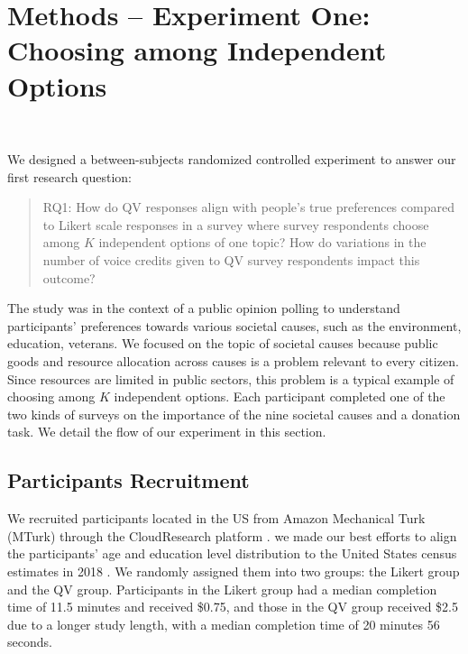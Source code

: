\section{Methods -- Experiment One: Choosing among Independent Options}~\label{method_exp1}

We designed a between-subjects randomized controlled experiment to answer our first research question: \begin{quote} RQ1: How do QV responses align with people's true preferences compared to Likert scale responses in a survey where survey respondents choose among $K$ independent options of one topic? How do variations in the number of voice credits given to QV survey respondents impact this outcome? \end{quote} The study was in the context of a public opinion polling to understand participants' preferences towards various societal causes, such as the environment, education, veterans. We focused on the topic of societal causes because public goods and resource allocation across causes is a problem relevant to every citizen. Since resources are limited in public sectors, this problem is a typical example of choosing among $K$ independent options. Each participant completed one of the two kinds of surveys on the importance of the nine societal causes and a donation task. We detail the flow of our experiment in this section.

\subsection{Participants Recruitment}
We recruited participants located in the US from Amazon Mechanical Turk (MTurk) through the CloudResearch platform \cite{litman2017turkprime} .  we made our best efforts to align the participants' age and education level distribution to the  United States census estimates in 2018 \cite{census2018}. We randomly assigned them into two groups: the Likert group and the QV group. Participants in the Likert group had a median completion time of 11.5 minutes and received \$0.75, and those in the QV group received \$2.5 due to a longer study length, with a median completion time of 20 minutes 56 seconds.

